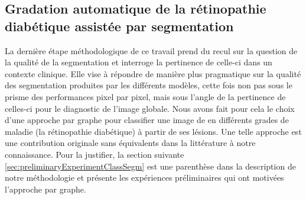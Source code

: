 \subsection{Gradation automatique de la rétinopathie diabétique assistée par segmentation}
La dernière étape méthodologique de ce travail prend du recul sur la question de la qualité de la segmentation et interroge la pertinence de celle-ci dans un contexte clinique. Elle vise à répondre de manière plus pragmatique sur la qualité des segmentation produites par les différents modèles, cette fois non pas sous le prisme des performances pixel par pixel, mais sous l'angle de la pertinence de celles-ci pour le diagnostic de l'image globale. Nous avons fait pour cela le choix d'une approche par graphe pour classifier une image de \fundus{} en différents grades de maladie (la rétinopathie diabétique) à partir de ses lésions. Une telle approche est une contribution originale sans équivalents dans la littérature à notre connaissance. Pour la justifier, la section suivante \ref{sec:preliminaryExperimentClassSegm} est une parenthèse dans la description de notre méthodologie et présente les expériences préliminaires qui ont motivées l'approche par graphe. 

